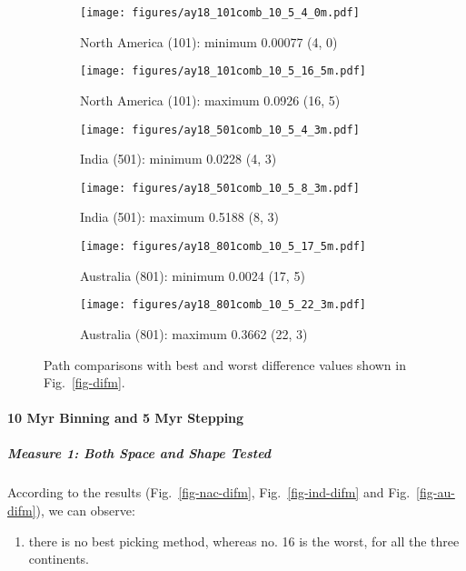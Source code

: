 \begin{figure*}
	\centering
	\begin{subfigure}{.42\textwidth}
		\texttt{[image: figures/ay18\_101comb\_10\_5\_4\_0m.pdf]}
		\caption{North America (101): minimum 0.00077 (4, 0)}\label{fig-nac-10540m}
	\end{subfigure}
	\begin{subfigure}{.42\textwidth}
		\texttt{[image: figures/ay18\_101comb\_10\_5\_16\_5m.pdf]}
		\caption{North America (101): maximum 0.0926 (16, 5)}\label{fig-nac-105165m}
	\end{subfigure}
	\vspace{.1em}
	\begin{subfigure}{.42\textwidth}
		\texttt{[image: figures/ay18\_501comb\_10\_5\_4\_3m.pdf]}
		\caption{India (501): minimum 0.0228 (4, 3)}\label{fig-ind-10543m}
	\end{subfigure}
	\begin{subfigure}{.42\textwidth}
		\texttt{[image: figures/ay18\_501comb\_10\_5\_8\_3m.pdf]}
		\caption{India (501): maximum 0.5188 (8, 3)}\label{fig-ind-10583m}
	\end{subfigure}
	\vspace{.1em}
	\begin{subfigure}{.42\textwidth}
		\texttt{[image: figures/ay18\_801comb\_10\_5\_17\_5m.pdf]}
		\caption{Australia (801): minimum 0.0024 (17, 5)}\label{fig-au-105175m}
	\end{subfigure}
	\begin{subfigure}{.42\textwidth}
		\texttt{[image: figures/ay18\_801comb\_10\_5\_22\_3m.pdf]}
		\caption{Australia (801): maximum 0.3662 (22, 3)}\label{fig-au-105223m}
	\end{subfigure}
	\caption[Best and worst differences with test (10 Myr bin, 5 Myr
step)]{Path comparisons with best and worst difference values shown in
Fig.~\ref{fig-difm}.}\label{fig-difbwm}
\end{figure*}

\paragraph{10 Myr Binning and 5 Myr Stepping}

\subparagraph{Measure 1: Both Space and Shape Tested}

According to the results (Fig.~\ref{fig-nac-difm}, Fig.~\ref{fig-ind-difm} and
Fig.~\ref{fig-au-difm}), we can observe:
%
\begin{enumerate}
  \item there is no best picking method, whereas no. 16 is the worst, for all
		the three continents.
\end{enumerate}

